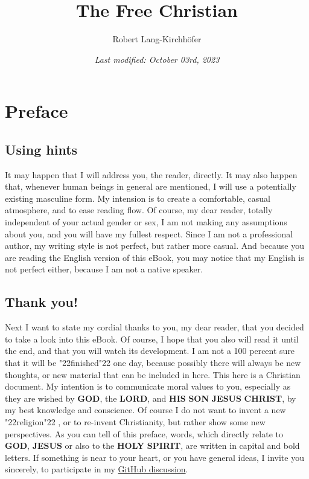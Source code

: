 \documentclass[12pt,a4paper]{article}
\title{\textbf{The Free Christian}}
\author{Robert Lang-Kirchh\"ofer}
\date{\textit{Last modified: October 03rd, 2023}}
\newcommand{\Christ}[0]{\textbf{CHRIST}}
\newcommand{\God}[0]{\textbf{GOD}}
\newcommand{\His}[0]{\textbf{HIS}}
\newcommand{\Holy}[0]{\textbf{HOLY}}
\newcommand{\Jesus}[0]{\textbf{JESUS}}
\newcommand{\Lord}[0]{\textbf{LORD}}
\newcommand{\Son}[0]{\textbf{SON}}
\newcommand{\Spirit}[0]{\textbf{SPIRIT}}
\newcommand{\q}[1]{\char"22{#1}\char"22 }
\begin{document}
	\setlength{\parindent}{0mm}
	\maketitle

	\newpage
	\tableofcontents

	\newpage
	\section{Preface}

	\subsection{Using hints}
		It may happen that I will address you,
		the reader,
		directly.
		It may also happen that,
		whenever human beings in general are mentioned,
		I will use a potentially existing masculine form.
		My intension is to create a comfortable,
		casual atmosphere,
		and to ease reading flow.
		Of course,
		my dear reader,
		totally independent of your actual gender or sex,
		I am not making any assumptions about you,
		and you will have my fullest respect.
		Since I am not a professional author,
		my writing style is not perfect,
		but rather more casual.
		And because you are reading the English version of this eBook,
		you may notice that my English is not perfect either,
		because I am not a native speaker.
		
	\subsection{Thank you!}
		Next I want to state my cordial thanks to you,
		my dear reader,
		that you decided to take a look into this eBook.
		Of course,
		I hope that you also will read it until the end,
		and that you will watch its development.
		I am not a 100 percent sure that it will be \q{finished} one day,
		because possibly there will always be new thoughts,
		or new material that can be included in here.
		This here is a Christian document.
		My intention is to communicate moral values to you,
		especially as they are wished by {\God}, the {\Lord},
		and {\His} {\Son} {\Jesus} {\Christ},
		by my best knowledge and conscience.
		Of course I do not want to invent a new \q{religion},
		or to re-invent Christianity,
		but rather show some new perspectives.
		As you can tell of this preface,
		words,
		which directly relate to {\God},
		{\Jesus} or also to the {\Holy} {\Spirit},
		are written in capital and bold letters.
		If something is near to your heart,
		or you have general ideas,
		I invite you sincerely,
		to participate in my  \href{https://github.com/DerRobert-28/Der-Freie-Christ/discussions}{GitHub discussion}.
	
\end{document}
